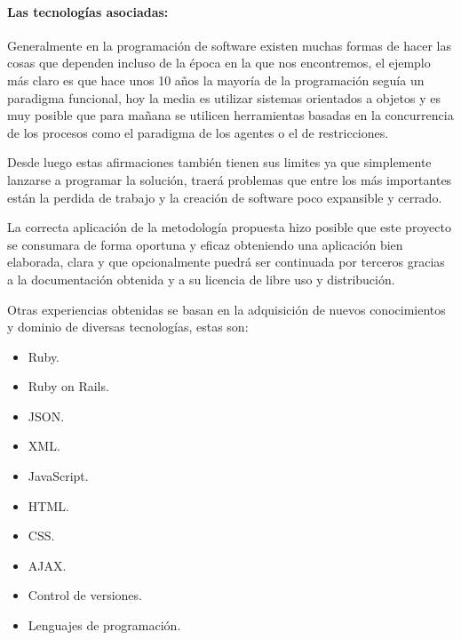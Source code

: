 \paragraph{Las tecnologías asociadas:}
Generalmente en la programación de software existen muchas formas de hacer las cosas que dependen incluso de la época en la que nos encontremos, el ejemplo más claro es que hace unos 10 años la mayoría de la programación seguía un paradigma funcional, hoy la media es utilizar sistemas orientados a objetos y es muy posible que para mañana se utilicen herramientas basadas en la concurrencia de los procesos como el paradigma de los agentes o el de restricciones.


Desde luego estas afirmaciones también tienen sus limites ya que simplemente lanzarse a programar la solución, traerá problemas que entre los más importantes están la perdida de trabajo y la creación de software poco expansible y cerrado.

La correcta aplicación de la metodología propuesta hizo posible que este proyecto se consumara de forma oportuna y eficaz obteniendo una aplicación bien elaborada, clara y que opcionalmente puedrá ser continuada por terceros gracias a la documentación obtenida y a su licencia de libre uso y distribución.

Otras experiencias obtenidas se basan en la adquisición de nuevos conocimientos y dominio de diversas tecnologías, estas son:

\begin{itemize}
	\item Ruby.
	\item Ruby on Rails.
	\item JSON.
	\item XML.
	\item JavaScript.
	\item HTML.
	\item CSS.
	\item AJAX.
	\item Control de versiones.
	\item Lenguajes de programación.
\end{itemize}

